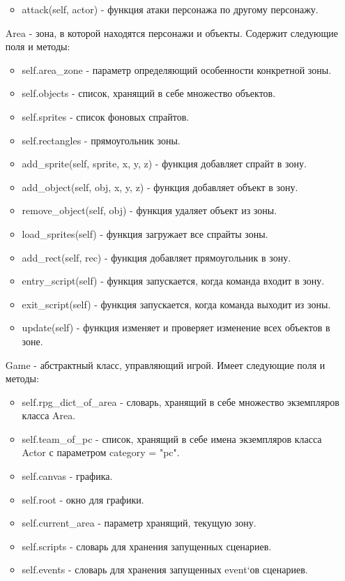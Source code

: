 \begin{enumerate}
\begin{itemize}
		\item attack(self, actor) -  функция атаки персонажа по другому персонажу.
	\end{itemize}
	\item[Area] - зона, в которой находятся персонажи и объекты. Содержит следующие поля и методы:
	\begin{itemize}
		\item self.area\_zone - параметр определяющий особенности конкретной зоны.
		\item self.objects - список, хранящий в себе множество объектов.
		\item self.sprites - список фоновых спрайтов.
		\item self.rectangles - прямоугольник зоны.
		\item add\_sprite(self, sprite, x, y, z) - функция добавляет спрайт в зону.
		\item add\_object(self, obj, x, y, z) - функция добавляет объект в зону.
		\item remove\_object(self, obj) - функция удаляет объект из зоны.
		\item load\_sprites(self) - функция загружает все спрайты зоны.
		\item add\_rect(self, rec) - функция добавляет прямоугольник в зону.
		\item entry\_script(self) - функция запускается, когда команда входит в зону.
		\item exit\_script(self) - функция запускается, когда команда выходит из зоны.
		\item update(self) - функция изменяет и проверяет изменение всех объектов в зоне.
	\end{itemize}
	\item[Game] - абстрактный класс, управляющий игрой. Имеет следующие поля и методы:
	\begin{itemize}
		\item self.rpg\_dict\_of\_area - словарь, хранящий в себе множество экземпляров класса Area.
		\item self.team\_of\_pc - список, хранящий в себе имена экземпляров класса Actor с параметром category = "pc".
		\item self.canvas - графика.
		\item self.root - окно для графики.
		\item self.current\_area - параметр хранящий, текущую зону.
		\item self.scripts - словарь для хранения запущенных сценариев.
		\item self.events - словарь для хранения запущенных event`ов сценариев.

\end{itemize}
\end{enumerate}
